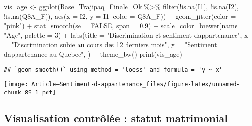 \documentclass[
]{article}
\newenvironment{Shaded}{\begin{snugshade}}{\end{snugshade}}
\newcommand{\AttributeTok}[1]{\textcolor[rgb]{0.77,0.63,0.00}{#1}}
\newcommand{\ConstantTok}[1]{\textcolor[rgb]{0.00,0.00,0.00}{#1}}
\newcommand{\DecValTok}[1]{\textcolor[rgb]{0.00,0.00,0.81}{#1}}
\newcommand{\FloatTok}[1]{\textcolor[rgb]{0.00,0.00,0.81}{#1}}
\newcommand{\FunctionTok}[1]{\textcolor[rgb]{0.00,0.00,0.00}{#1}}
\newcommand{\NormalTok}[1]{#1}
\newcommand{\OtherTok}[1]{\textcolor[rgb]{0.56,0.35,0.01}{#1}}
\newcommand{\SpecialCharTok}[1]{\textcolor[rgb]{0.00,0.00,0.00}{#1}}
\newcommand{\StringTok}[1]{\textcolor[rgb]{0.31,0.60,0.02}{#1}}
\begin{document}
\begin{Shaded}
\begin{Highlighting}[]
\NormalTok{vis\_age }\OtherTok{\textless{}{-}} \FunctionTok{ggplot}\NormalTok{(Base\_Trajipaq\_Finale\_Ok }\SpecialCharTok{\%\textgreater{}\%}
                \FunctionTok{filter}\NormalTok{(}\SpecialCharTok{!}\FunctionTok{is.na}\NormalTok{(I1), }\SpecialCharTok{!}\FunctionTok{is.na}\NormalTok{(I2), }\SpecialCharTok{!}\FunctionTok{is.na}\NormalTok{(Q8A\_F)), }\FunctionTok{aes}\NormalTok{(}\AttributeTok{x =}\NormalTok{ I2, }\AttributeTok{y =}\NormalTok{ I1, }\AttributeTok{color =}\NormalTok{ Q8A\_F)) }\SpecialCharTok{+}
  \FunctionTok{geom\_jitter}\NormalTok{(}\AttributeTok{color =} \StringTok{"pink"}\NormalTok{) }\SpecialCharTok{+}
  \FunctionTok{stat\_smooth}\NormalTok{(}\AttributeTok{se =} \ConstantTok{FALSE}\NormalTok{, }\AttributeTok{span =} \FloatTok{0.9}\NormalTok{) }\SpecialCharTok{+}
  \FunctionTok{scale\_color\_brewer}\NormalTok{(}\AttributeTok{name =} \StringTok{"Age"}\NormalTok{, }\AttributeTok{palette =} \DecValTok{3}\NormalTok{) }\SpecialCharTok{+}
  \FunctionTok{labs}\NormalTok{(}\AttributeTok{title =} \StringTok{"Discrimination et sentiment d\textquotesingle{}appartenance"}\NormalTok{, }
       \AttributeTok{x =} \StringTok{"Discrimination subie au cours des 12 derniers mois"}\NormalTok{, }
       \AttributeTok{y =} \StringTok{"Sentiment d\textquotesingle{}appartenance au Quebec"}\NormalTok{,}
\NormalTok{       ) }\SpecialCharTok{+}
  \FunctionTok{theme\_bw}\NormalTok{()}
\FunctionTok{print}\NormalTok{(vis\_age)}
\end{Highlighting}
\end{Shaded}

\begin{verbatim}
## `geom_smooth()` using method = 'loess' and formula = 'y ~ x'
\end{verbatim}

\texttt{[image: Article---Sentiment-d-appartenance\_files/figure-latex/unnamed-chunk-89-1.pdf]}

\hypertarget{visualisation-contruxf4luxe9e-statut-matrimonial}{%
\subsection{Visualisation contrôlée : statut
matrimonial}\label{visualisation-contruxf4luxe9e-statut-matrimonial}}
\end{document}
